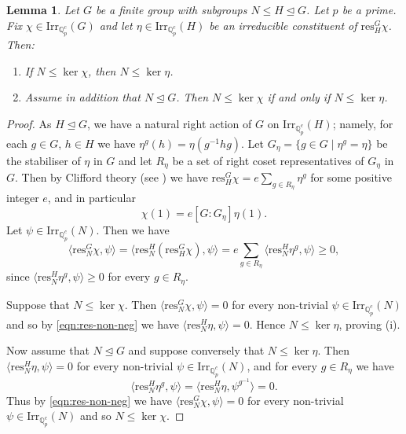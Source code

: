 \documentclass[12pt]{amsart}
\theoremstyle{plain}
\newtheorem{lemma}[theorem]{Lemma}
\theoremstyle{remark}
\theoremstyle{definition}
\numberwithin{equation}{section}
\begin{document}
\begin{lemma}\label{lem:kernel-basechange}
Let $G$ be a finite group with subgroups $N \leq H \unlhd  G$.
Let $p$ be a prime.
Fix $\chi \in {\mathrm{Irr}}_{{\mathbb{Q}}_{p}^{c}}(G)$ and let $\eta \in {\mathrm{Irr}}_{{\mathbb{Q}}_{p}^{c}}(H)$ be an irreducible constituent of ${\mathrm{res}}^{G}_{H} \chi$.
Then:
\begin{enumerate}
\item If $N \leq \ker \chi$, then $N \leq \ker \eta$.
\item Assume in addition that $N \unlhd G$. Then $N \leq \ker \chi$ if and only if $N \leq \ker \eta$.
\end{enumerate}
\end{lemma}

\begin{proof}
As $H \unlhd G$, we have a natural right action of $G$ on ${\mathrm{Irr}}_{{\mathbb{Q}}_{p}^{c}}(H)$;
namely, for each $g \in G$, $h \in H$ we have $\eta^{g}(h) = \eta(g^{-1}hg)$.
Let $G_{\eta} = \{g \in G \mid \eta^{g} = \eta \}$ be the stabiliser of $\eta$ in $G$ and
let $R_{\eta}$ be a set of right coset representatives of $G_{\eta}$ in $G$.
Then by Clifford theory (see \cite[Proposition 11.4]{MR632548}) we have
${\mathrm{res}}^{G}_{H} \chi = e \sum_{g \in R_{\eta}} \eta^{g}$ for some positive integer $e$, and in particular
\begin{equation}\label{eqn:Clifford-theory}
\chi(1) = e [G:G_{\eta}] \eta(1).
\end{equation}
Let $\psi \in {\mathrm{Irr}}_{{\mathbb{Q}}_{p}^{c}}(N)$. Then we have
\begin{equation}\label{eqn:res-non-neg}
\langle {\mathrm{res}}^{G}_{N} \chi, \psi \rangle = \langle {\mathrm{res}}^{H}_{N} ({\mathrm{res}}^{G}_{H} \chi), \psi \rangle
= e \sum_{g \in R_{\eta}} \langle {\mathrm{res}}^{H}_{N} \eta^{g}, \psi \rangle \geq 0,
\end{equation}
since $\langle {\mathrm{res}}^{H}_{N} \eta^{g}, \psi \rangle \geq 0$ for every $g \in R_{\eta}$.

Suppose that $N \leq \ker \chi$.
Then $\langle {\mathrm{res}}^{G}_{N} \chi, \psi \rangle = 0$ for every non-trivial $\psi \in {\mathrm{Irr}}_{{\mathbb{Q}}_{p}^{c}}(N)$ and so by \eqref{eqn:res-non-neg} we have $\langle {\mathrm{res}}^{H}_{N} \eta, \psi \rangle = 0$. Hence $N \leq \ker \eta$, proving (i).

Now assume that $N \unlhd G$ and suppose conversely that $N \leq \ker \eta$.
Then $\langle {\mathrm{res}}^{H}_{N} \eta, \psi \rangle = 0$ for every non-trivial $\psi \in {\mathrm{Irr}}_{{\mathbb{Q}}_{p}^{c}}(N)$,
and for every $g \in R_{\eta}$ we have
\[
    \langle {\mathrm{res}}^{H}_{N} \eta^{g}, \psi \rangle = \langle {\mathrm{res}}^{H}_{N} \eta, \psi^{g^{-1}} \rangle = 0.
\]
Thus by \eqref{eqn:res-non-neg} we have $\langle {\mathrm{res}}^{G}_{N} \chi, \psi \rangle = 0$
for every non-trivial $\psi \in {\mathrm{Irr}}_{{\mathbb{Q}}_{p}^{c}}(N)$ and so  $N \leq \ker \chi$.
\end{proof}
\end{document}
